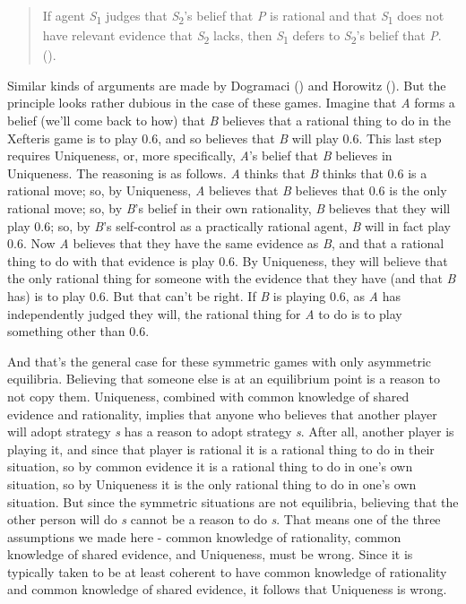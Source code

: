 \documentclass[
  11pt,
  letterpaper,
  DIV=11,
  numbers=noendperiod,
  twoside]{scrartcl}
\begin{document}
\begin{quote}
If agent \emph{S}\textsubscript{1} judges that
\emph{S}\textsubscript{2}'s belief that \emph{P} is rational and that
\emph{S}\textsubscript{1} does not have relevant evidence that
\emph{S}\textsubscript{2} lacks, then \emph{S}\textsubscript{1} defers
to \emph{S}\textsubscript{2}'s belief that \emph{P}.
().
\end{quote}

Similar kinds of arguments are made by Dogramaci
() and Horowitz
(). But the principle looks rather
dubious in the case of these games. Imagine that \emph{A} forms a belief
(we'll come back to how) that \emph{B} believes that a rational thing to
do in the Xefteris game is to play 0.6, and so believes that \emph{B}
will play 0.6. This last step requires Uniqueness, or, more
specifically, \emph{A}'s belief that \emph{B} believes in Uniqueness.
The reasoning is as follows. \emph{A} thinks that \emph{B} thinks that
0.6 is a rational move; so, by Uniqueness, \emph{A} believes that
\emph{B} believes that 0.6 is the only rational move; so, by \emph{B}'s
belief in their own rationality, \emph{B} believes that they will play
0.6; so, by \emph{B}'s self-control as a practically rational agent,
\emph{B} will in fact play 0.6. Now \emph{A} believes that they have the
same evidence as \emph{B}, and that a rational thing to do with that
evidence is play 0.6. By Uniqueness, they will believe that the only
rational thing for someone with the evidence that they have (and that
\emph{B} has) is to play 0.6. But that can't be right. If \emph{B} is
playing 0.6, as \emph{A} has independently judged they will, the
rational thing for \emph{A} to do is to play something other than 0.6.

And that's the general case for these symmetric games with only
asymmetric equilibria. Believing that someone else is at an equilibrium
point is a reason to not copy them. Uniqueness, combined with common
knowledge of shared evidence and rationality, implies that anyone who
believes that another player will adopt strategy \emph{s} has a reason
to adopt strategy \emph{s}. After all, another player is playing it, and
since that player is rational it is a rational thing to do in their
situation, so by common evidence it is a rational thing to do in one's
own situation, so by Uniqueness it is the only rational thing to do in
one's own situation. But since the symmetric situations are not
equilibria, believing that the other person will do \emph{s} cannot be a
reason to do \emph{s}. That means one of the three assumptions we made
here - common knowledge of rationality, common knowledge of shared
evidence, and Uniqueness, must be wrong. Since it is typically taken to
be at least coherent to have common knowledge of rationality and common
knowledge of shared evidence, it follows that Uniqueness is wrong.
\end{document}
